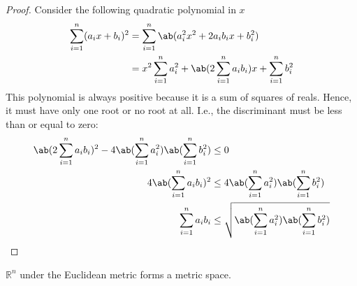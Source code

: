 \begin{proof}
  Consider the following quadratic polynomial in \(x\)
  \begin{align}
    \sum_{i=1}^n (a_i x + b_i)^2 & = \sum_{i=1}^n \ab(a_i^2 x^2 + 2 a_i b_i x + b_i^2)                                     \\
                                 & = x^2 \sum_{i=1}^n a_i^2 + \ab(2 \sum_{i=1}^n a_i b_i) x + \sum_{i=1}^n b_i^2 \nonumber
  \end{align}
  This polynomial is always positive because it is a sum of squares of reals. Hence, it must
  have only one root or no root at all. I.e., the discriminant must be less than or equal to zero:
  \begin{align}
    \ab(2 \sum_{i=1}^n a_i b_i)^2 - 4 \ab(\sum_{i=1}^n a_i^2) \ab(\sum_{i=1}^n b_i^2) & \leq 0                                                               \\
    4 \ab(\sum_{i=1}^n a_i b_i)^2                                                     & \leq 4 \ab(\sum_{i=1}^n a_i^2) \ab(\sum_{i=1}^n b_i^2)               \\
    \sum_{i=1}^n a_i b_i                                                              & \leq \sqrt{\ab(\sum_{i=1}^n a_i^2) \ab(\sum_{i=1}^n b_i^2)} \qedhere
  \end{align}
\end{proof}

\begin{cor}{}{}
  \(\mathbb{R}^n\) under the Euclidean metric forms a metric space.
\end{cor}

